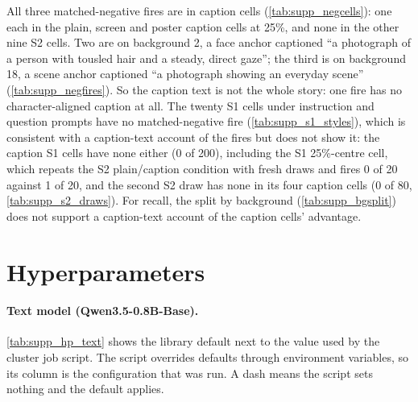 All three matched-negative fires are in caption cells (\cref{tab:supp_negcells}):
one each in the plain, screen and poster caption cells at 25\%, and none in the
other nine S2 cells. Two are on background 2, a face anchor captioned
``a photograph of a person with tousled hair and a steady, direct gaze''; the
third is on background 18, a scene anchor captioned ``a photograph showing an
everyday scene'' (\cref{tab:supp_negfires}). So the caption text is not the
whole story: one fire has no character-aligned caption at all. The twenty S1 cells
under instruction and question prompts have no matched-negative fire
(\cref{tab:supp_s1_styles}), which is consistent with a caption-text account of the
fires but does not show it: the caption S1 cells have none either (0 of 200),
including the S1 25\%-centre cell, which repeats the S2 plain/caption condition with
fresh draws and fires 0 of 20 against 1 of 20, and the second S2 draw has none in its
four caption cells (0 of 80, \cref{tab:supp_s2_draws}). For recall, the split by
background (\cref{tab:supp_bgsplit}) does not support a caption-text account of the
caption cells' advantage.

\section{Hyperparameters}
\label{sec:supp_hparams}

\paragraph{Text model (Qwen3.5-0.8B-Base).}
\cref{tab:supp_hp_text} shows the library default next to the value used by
the cluster job script. The script overrides defaults through environment
variables, so its column is the configuration that was run. A dash means the
script sets nothing and the default applies.


